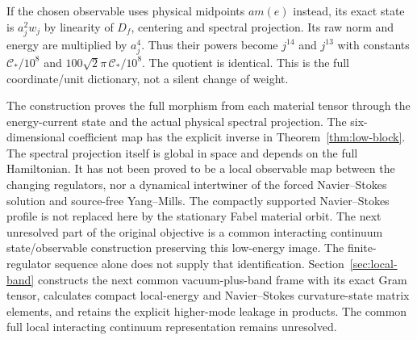 If the chosen observable uses physical midpoints $am(e)$ instead,
its exact state is $a_j^2w_j$ by linearity of $D_f$, centering and
spectral projection. Its raw norm and energy are multiplied by $a_j^4$.
Thus their powers become $j^{14}$ and $j^{13}$ with constants
$\mathcal C_*/10^8$ and $100\sqrt2\pi\,\mathcal C_*/10^8$.
The quotient is identical. This is the full coordinate/unit dictionary,
not a silent change of weight.

The construction proves the full morphism from each material tensor
through the energy-current state and the actual physical spectral
projection. The six-dimensional coefficient map has the explicit
inverse in Theorem~\ref{thm:low-block}.
The spectral projection itself is global in space and depends on the
full Hamiltonian. It has not been proved to be a local observable map
between the changing regulators, nor a dynamical intertwiner of the
forced Navier--Stokes solution and source-free Yang--Mills.
The compactly supported Navier--Stokes profile is not replaced here by
the stationary Fabel material orbit. The next unresolved part of the
original objective is a common interacting continuum state/observable
construction preserving this low-energy image. The finite-regulator
sequence alone does not supply that identification.
Section~\ref{sec:local-band} constructs the next common
vacuum-plus-band frame with its exact Gram tensor, calculates compact
local-energy and Navier--Stokes curvature-state matrix elements, and
retains the explicit higher-mode leakage in products. The common
full local interacting continuum representation remains unresolved.
